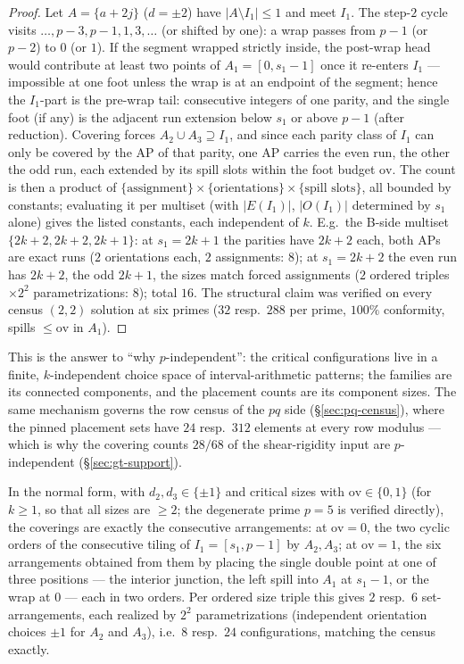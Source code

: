 \begin{proof}
Let $A=\{a+2j\}$ ($d=\pm2$) have $|A\setminus I_1|\le1$ and meet $I_1$.
The step-$2$ cycle visits $\dots,p{-}3,p{-}1,1,3,\dots$ (or shifted by
one): a wrap passes from $p-1$ (or $p-2$) to $0$ (or $1$). If the segment
wrapped strictly inside, the post-wrap head would contribute at least two
points of $A_1=[0,s_1-1]$ once it re-enters $I_1$ --- impossible at one
foot unless the wrap is at an endpoint of the segment; hence the $I_1$-part
is the pre-wrap tail: consecutive integers of one parity, and the single
foot (if any) is the adjacent run extension below $s_1$ or above $p-1$
(after reduction). Covering forces $A_2\cup A_3\supseteq I_1$, and since
each parity class of $I_1$ can only be covered by the AP of that parity,
one AP carries the even run, the other the odd run, each extended by its
spill slots within the foot budget $\mathrm{ov}$. The count is then a
product of $\{\text{assignment}\}\times\{\text{orientations}\}\times
\{\text{spill slots}\}$, all bounded by constants; evaluating it per
multiset (with $|E(I_1)|$, $|O(I_1)|$ determined by $s_1$ alone) gives the
listed constants, each independent of $k$. E.g.\ the B-side multiset
$\{2k{+}2,2k{+}2,2k{+}1\}$: at $s_1=2k{+}1$ the parities have $2k{+}2$
each, both APs are exact runs ($2$ orientations each, $2$ assignments:
$8$); at $s_1=2k{+}2$ the even run has $2k{+}2$, the odd $2k{+}1$, the
sizes match forced assignments ($2$ ordered triples $\times2^2$
parametrizations: $8$); total $16$. The structural claim was verified on
every census $(2,2)$ solution at six primes ($32$ resp.\ $288$ per prime,
$100\%$ conformity, spills $\le\mathrm{ov}$ in $A_1$).
\end{proof}

This is the answer to ``why $p$-independent'': the critical configurations
live in a finite, $k$-independent choice space of interval-arithmetic
patterns; the families are its connected components, and the placement
counts are its component sizes. The same mechanism governs the row census
of the $pq$ side (\S\ref{sec:pq-census}), where the pinned placement sets
have $24$ resp.\ $312$ elements at every row modulus --- which is why the
covering counts $28/68$ of the shear-rigidity input are $p$-independent
(\S\ref{sec:gt-support}).

\begin{proposition}\label{prop:F1}
In the normal form, with $d_2,d_3\in\{\pm1\}$ and critical sizes with
$\mathrm{ov}\in\{0,1\}$ (for $k\ge1$, so that all sizes are $\ge2$; the
degenerate prime $p=5$ is verified directly), the coverings are exactly the consecutive
arrangements: at $\mathrm{ov}=0$, the two cyclic orders of the consecutive
tiling of $I_1=[s_1,p-1]$ by $A_2,A_3$; at $\mathrm{ov}=1$, the six
arrangements obtained from them by placing the single double point at one of
three positions --- the interior junction, the left spill into $A_1$ at
$s_1-1$, or the wrap at $0$ --- each in two orders. Per ordered size triple
this gives $2$ resp.\ $6$ set-arrangements, each realized by $2^2$
parametrizations (independent orientation choices $\pm1$ for $A_2$ and
$A_3$), i.e.\ $8$ resp.\ $24$ configurations, matching the census exactly.
\end{proposition}

